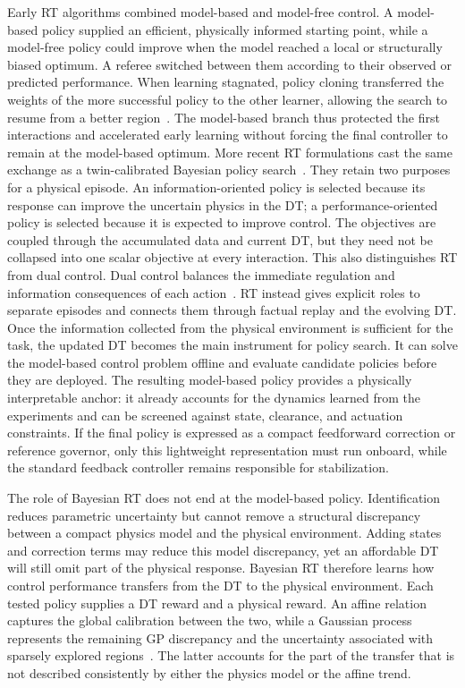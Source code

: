 \documentclass[journal]{IEEEtran}
\begin{document}
Early RT algorithms combined model-based and model-free control. A model-based policy supplied an efficient, physically informed starting point, while a model-free policy could improve when the model reached a local or structurally biased optimum. A referee switched between them according to their observed or predicted performance. When learning stagnated, policy cloning transferred the weights of the more successful policy to the other learner, allowing the search to resume from a better region~\cite{SchenaRT2023,PolettiRT2025}. The model-based branch thus protected the first interactions and accelerated early learning without forcing the final controller to remain at the model-based optimum.
More recent RT formulations cast the same exchange as a twin-calibrated Bayesian policy search~\cite{Mendez2026}. They retain two purposes for a physical episode. An information-oriented policy is selected because its response can improve the uncertain physics in the DT; a performance-oriented policy is selected because it is expected to improve control. The objectives are coupled through the accumulated data and current DT, but they need not be collapsed into one scalar objective at every interaction. This also distinguishes RT from dual control. Dual control balances the immediate regulation and information consequences of each action~\cite{Feldbaum1960,Filatov2000,Mesbah2018}. RT instead gives explicit roles to separate episodes and connects them through factual replay and the evolving DT. Once the information collected from the physical environment is sufficient for the task, the updated DT becomes the main instrument for policy search. It can solve the model-based control problem offline and evaluate candidate policies before they are deployed. The resulting model-based policy provides a physically interpretable anchor: it already accounts for the dynamics learned from the experiments and can be screened against state, clearance, and actuation constraints. If the final policy is expressed as a compact feedforward correction or reference governor, only this lightweight representation must run onboard, while the standard feedback controller remains responsible for stabilization.

The role of Bayesian RT does not end at the model-based policy. Identification reduces parametric uncertainty but cannot remove a structural discrepancy between a compact physics model and the physical environment. Adding states and correction terms may reduce this model discrepancy, yet an affordable DT will still omit part of the physical response. Bayesian RT therefore learns how control performance transfers from the DT to the physical environment. Each tested policy supplies a DT reward and a physical reward. An affine relation captures the global calibration between the two, while a Gaussian process represents the remaining GP discrepancy and the uncertainty associated with sparsely explored regions~\cite{Kennedy2001,Rasmussen2006}. The latter accounts for the part of the transfer that is not described consistently by either the physics model or the affine trend.
\end{document}
